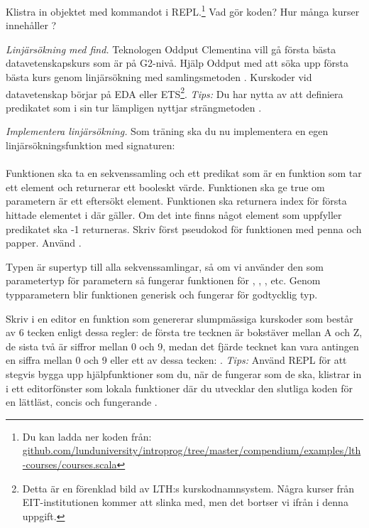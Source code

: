 \Subtask \label{subtask:download-lthcourses} Klistra in objektet  med kommandot  i REPL.\footnote{Du kan ladda ner koden från: \\ \href{https://raw.githubusercontent.com/lunduniversity/introprog/master/compendium/examples/lth-courses/courses.scala}{github.com/lunduniversity/introprog/tree/master/compendium/examples/lth-courses/courses.scala}} Vad gör koden? Hur många kurser innehåller ?


\Subtask \emph{Linjärsökning med find.} Teknologen Oddput Clementina vill gå första bästa datavetenskapskurs som är på G2-nivå. Hjälp Oddput med att söka upp första bästa kurs genom linjärsökning med samlingsmetoden . Kurskoder vid datavetenskap börjar på EDA eller ETS\footnote{Detta är en förenklad bild av LTH:s kurskodnamnsystem. Några kurser från EIT-institutionen  kommer att slinka med, men det bortser vi ifrån i denna uppgift.}. \emph{Tips:} Du har nytta av att definiera predikatet  som i sin tur lämpligen nyttjar strängmetoden .

\Subtask \emph{Implementera linjärsökning.} Som träning ska du nu implementera en egen linjärsökningsfunktion med signaturen: \\ 
\\ Funktionen ska ta en sekvenssamling  och ett predikat  som är en funktion som tar ett element och returnerar ett booleskt värde. Funktionen  ska ge true om parametern är ett eftersökt element. Funktionen  ska returnera index för första hittade elementet i  där  gäller. Om det inte finns något element som uppfyller predikatet ska -1 returneras. Skriv först pseudokod för funktionen med penna och papper. Använd . 

Typen  är supertyp till alla sekvenssamlingar, så om vi använder den som parametertyp för parametern  så fungerar funktionen för , , , etc. Genom typparametern  blir funktionen generisk och fungerar för godtycklig typ. 



\Subtask \label{subtask:linsearch-rndCode} Skriv i en editor en funktion  som genererar slumpmässiga kurskoder som består av 6 tecken enligt dessa regler: de första tre tecknen är bokstäver mellan A och Z, de sista två är siffror mellan 0 och 9, medan det fjärde tecknet kan vara antingen en siffra mellan 0 och 9 eller ett av dessa tecken: . \emph{Tips:} Använd REPL  för att stegvis bygga upp hjälpfunktioner som du, när de fungerar som de ska, klistrar in i ett editorfönster som lokala funktioner där du utvecklar den slutliga koden för en lättläst, concis och fungerande .


